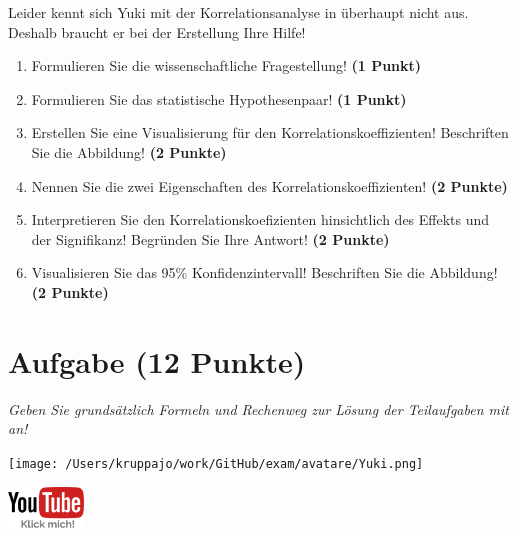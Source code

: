 \documentclass[a4paper, 9pt]{scrartcl}\usepackage[]{graphicx}\usepackage[]{xcolor}
\begin{document}
Leider kennt sich Yuki mit der Korrelationsanalyse in \Rlogo überhaupt nicht aus. Deshalb braucht er bei der Erstellung Ihre Hilfe!

\begin{enumerate}
  \item Formulieren Sie die wissenschaftliche Fragestellung! \textbf{(1 Punkt)}
  \item Formulieren Sie das statistische Hypothesenpaar! \textbf{(1 Punkt)}
\item Erstellen Sie eine Visualisierung für den Korrelationskoeffizienten! Beschriften Sie die Abbildung! \textbf{(2 Punkte)}
\item Nennen Sie die zwei Eigenschaften des Korrelationskoeffizienten! \textbf{(2 Punkte)}
\item Interpretieren Sie den Korrelationskoefizienten hinsichtlich des
  Effekts und der Signifikanz! Begründen Sie Ihre Antwort! \textbf{(2 Punkte)}
\item Visualisieren Sie das 95\% Konfidenzintervall! Beschriften Sie die Abbildung! \textbf{(2 Punkte)} 
\end{enumerate} 
\clearpage

\section{Aufgabe \hfill (12 Punkte)}

\textit{Geben Sie grundsätzlich Formeln und Rechenweg zur Lösung der Teilaufgaben mit an!} \\[1Ex]
 

 
\begin{minipage}[t]{0.5\textwidth}
\texttt{[image: /Users/kruppajo/work/GitHub/exam/avatare/Yuki.png]}
\end{minipage}
\begin{minipage}[t]{0.5\textwidth}
\hfill
\href{https://youtu.be/fB6nF4dxodA}{\includegraphics[width = 2cm]{img/youtube}}
\end{minipage}
\vspace{-3ex}
\end{document}
